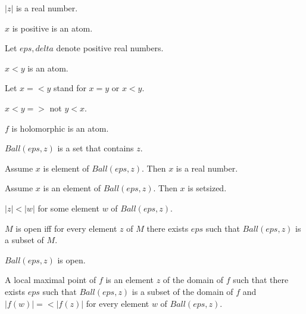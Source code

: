 \documentclass{article}
\begin{document}
\begin{forthel}
    \begin{signature}
      $|z|$ is a real number.
    \end{signature}

    \begin{signature}
      $x$ is positive is an atom.
    \end{signature}

    Let $eps, delta$ denote positive real numbers.

    \begin{signature}
      $x < y$ is an atom.
    \end{signature}

    Let $x =< y$ stand for $x = y$ or $x < y$.

    \begin{axiom}
      $x < y =>$ not $y < x$.
    \end{axiom}

    \begin{signature}
      $f$ is holomorphic is an atom.
    \end{signature}

    \begin{signature}
      $Ball(eps,z)$ is a set that contains $z$.
    \end{signature}

    \begin{axiom}
      Assume $x$ is element of $Ball(eps, z)$. Then $x$ is a real number.
    \end{axiom}

    \begin{lemma}
      Assume $x$ is an element of $Ball(eps, z)$. Then $x$ is setsized.
    \end{lemma}

    \begin{axiom}
      $|z| < |w|$ for some element $w$ of $Ball(eps,z)$.
    \end{axiom}

    \begin{definition}
      $M$ is open iff for every element $z$ of $M$ there exists $eps$ such that $Ball(eps,z)$ is a subset of $M$.
    \end{definition}

    \begin{axiom}
      $Ball(eps,z)$ is open.
    \end{axiom}

    \begin{definition}
      A local maximal point of $f$ is an element $z$ of the domain of $f$ such that there exists $eps$ such that $Ball(eps,z)$ is a subset of the domain of $f$ and $|f(w)| =< |f(z)|$ for every element $w$ of $Ball(eps,z)$.
    \end{definition}


\end{forthel}
\end{document}
